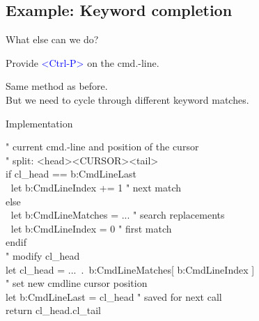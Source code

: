 \documentclass{beamer}
\newenvironment{mycode}[0]
{\ttfamily}
{}
\newcommand{\myind}[1]{\textcolor{white}{#1}}
\newcommand{\mycommt}[1]{\textcolor{comment}{#1}}
\newcommand{\mykeywd}[1]{\textcolor{keyword}{#1}}
\newcommand{\myctrlkey}[1]{\textcolor{blue}{#1}}
\begin{document}
\subsection{Example: Keyword completion}

\begin{frame}{What else can we do?}{}
	
	Provide \myctrlkey{<Ctrl-P>} on the cmd.-line. \\
	\vspace{5mm}

	Same method as before. \\
	But we need to cycle through different keyword matches.

\end{frame}

\begin{frame}{Implementation}{}

	\begin{mycode}
		\mycommt{" current cmd.-line and position of the cursor} \\
		\mycommt{" split: <head><CURSOR><tail>} \\[2mm]

		\mykeywd{if} cl\_head \mykeywd{==} b:CmdLineLast \\
		\myind{..}\mykeywd{let} b:CmdLineIndex {} += 1 {} {} {} \mycommt{" next match} \\
		\mykeywd{else} \\
		\myind{..}\mykeywd{let} b:CmdLineMatches = ... \mycommt{" search replacements} \\
		\myind{..}\mykeywd{let} b:CmdLineIndex {} {} = 0 {} {} {} \mycommt{" first match} \\
		\mykeywd{endif} \\[2mm]

		\mycommt{" modify cl\_head} \\
		\mykeywd{let} cl\_head = ...\ .\ b:CmdLineMatches[ b:CmdLineIndex ] \\[2mm]

		\mycommt{" set new cmdline cursor position} \\[2mm]

		\mykeywd{let} b:CmdLineLast = cl\_head {} {} \mycommt{" saved for next call} \\
		\mykeywd{return} cl\_head.cl\_tail \\
	\end{mycode}
		
\end{frame}
\end{document}
